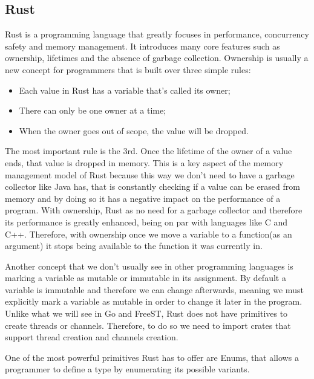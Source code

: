 \documentclass[runningheads]{llncs}
\begin{document}
\subsection{Rust}
Rust is a programming language that greatly focuses in performance, concurrency safety and memory management.
It introduces many core features such as ownership, lifetimes and the absence of garbage collection.
Ownership is usually a new concept for programmers that is built over three simple rules:
\begin{itemize}
\item Each value in Rust has a variable that’s called its owner;
\item There can only be one owner at a time;
\item When the owner goes out of scope, the value will be dropped.
\end{itemize}

The most important rule is the 3rd. Once the lifetime of the owner of a value ends, that value is dropped in memory. This is a key aspect of the memory management model of Rust because this way we don't need to have a garbage collector like Java has, that is constantly checking if a value can be erased from memory and by doing so it has a negative impact on the performance of a program. With ownership, Rust as no need for a garbage collector and therefore its performance is greatly enhanced, being on par with languages like C and C++. Therefore, with ownership once we move a variable to a function(as an argument) it stops being available to the function it was currently in.

Another concept that we don't usually see in other programming languages is marking a variable as mutable or immutable in its assignment. By default a variable is immutable and therefore we can change afterwards, meaning we must explicitly mark a variable as mutable in order to change it later in the program.\\
Unlike what we will see in Go and FreeST, Rust does not have primitives to create threads or channels. Therefore, to do so we need to import crates that support thread creation and channels creation.

One of the most powerful primitives Rust has to offer are Enums, that allows a programmer to define a type by enumerating its possible variants.
\end{document}
